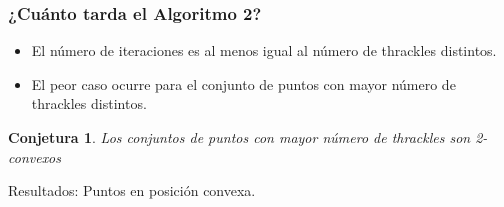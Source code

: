 \documentclass{beamer}
\newtheorem{conj}{Conjetura}
\begin{document}
\begin{frame}
  \frametitle{¿Cuánto tarda el Algoritmo 2?}
  \begin{overprint}
    \begin{itemize}
      \item El número de iteraciones es al menos igual al número de thrackles
        distintos.
      \item El peor caso ocurre para el conjunto de puntos con mayor número de
        thrackles distintos.
    \end{itemize}
    \begin{conj}
      Los conjuntos de puntos con mayor número de thrackles son 2-convexos
    \end{conj}
  \end{overprint}
  \begin{figure}[htb]
    \centering
    \def\svgwidth{10cm}
    
  \end{figure}
\end{frame}

\begin{frame}[c]
  \begin{center}
    \Huge Resultados: Puntos en posición convexa.
  \end{center}
\end{frame}

%  
\end{document}
